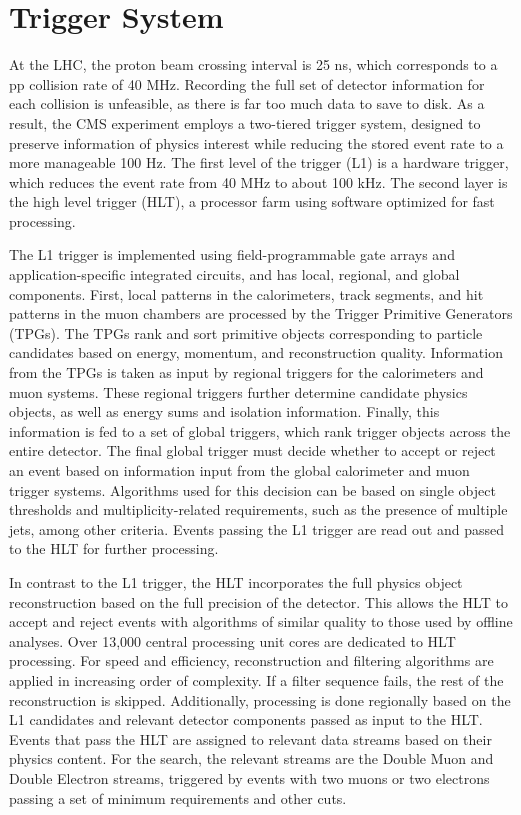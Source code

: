 \section{Trigger System}
At the LHC, the proton beam crossing interval is 25 ns, which corresponds to a pp collision rate of 40 MHz. Recording the full set of detector information for each collision is unfeasible, as there is far too much data to save to disk. As a result, the CMS experiment employs a two-tiered trigger system, designed to preserve information of physics interest while reducing the 
stored event rate to a more manageable 100 Hz. The first level of the trigger (L1) is a hardware trigger, which reduces the event rate from 40 MHz to about 100 kHz. The second layer is the 
high level trigger (HLT), a processor farm using software optimized for fast processing. 

The L1 trigger is implemented using field-programmable gate arrays and application-specific integrated circuits, and has local, regional, and global components. First, local patterns in the calorimeters, track segments, and hit patterns in the muon chambers 
are processed by the Trigger Primitive Generators (TPGs). The TPGs rank and sort primitive objects corresponding to particle candidates based on energy, momentum, and reconstruction quality. Information
from the TPGs is taken as input by regional triggers for the calorimeters and muon systems. These regional triggers further determine candidate physics objects, as well as energy sums and isolation
information. Finally, this information is fed to a set of global triggers, which rank trigger objects across the entire detector. The final global trigger must decide whether to accept or 
reject an event based on information input from the global calorimeter and muon trigger systems. Algorithms used for this decision can be based on single object \pt thresholds and multiplicity-related 
requirements, such as the presence of multiple jets, among other criteria. Events passing the L1 trigger are read out and passed to the HLT for further processing. 

In contrast to the L1 trigger, the HLT incorporates the full physics object reconstruction based on the full precision of the detector. This allows the HLT to accept and reject events with algorithms 
of similar quality to those used by offline analyses. Over 13,000 central processing unit cores are dedicated to HLT processing. For speed and efficiency, reconstruction and filtering algorithms are applied in increasing order of complexity. If a filter sequence fails, the rest of the reconstruction is skipped. Additionally, processing is done regionally based on the L1 candidates and relevant detector components 
passed as input to the HLT. Events that pass the HLT are assigned to relevant data streams based on their physics content. For the \hzg{} search, the relevant streams are the Double Muon and 
Double Electron streams, triggered by events with two muons or two electrons passing a set of minimum \pt requirements and other cuts. 

